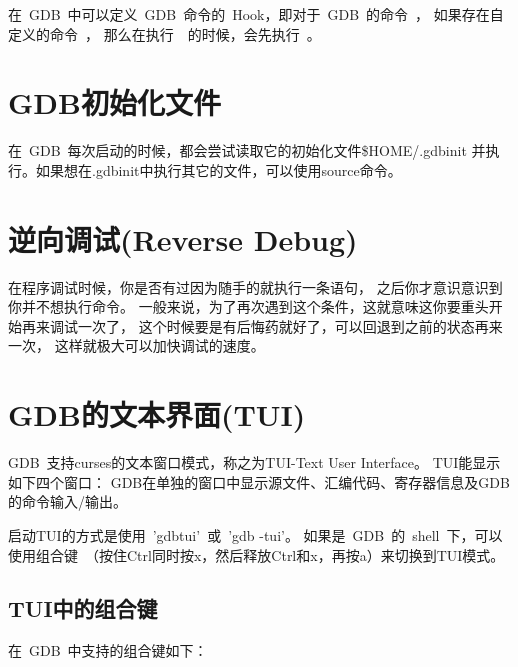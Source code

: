 在~GDB~中可以定义~GDB~命令的~Hook，即对于~GDB~的命令~，
如果存在自定义的命令~，
那么在执行~~的时候，会先执行~。


\section{GDB初始化文件}

在~GDB~每次启动的时候，都会尝试读取它的初始化文件\$HOME/.gdbinit
并执行。如果想在.gdbinit中执行其它的文件，可以使用source命令。

\noindent
{}



\section{逆向调试(Reverse Debug)}

在程序调试时候，你是否有过因为随手的就执行一条语句，
之后你才意识意识到你并不想执行命令。
一般来说，为了再次遇到这个条件，这就意味这你要重头开始再来调试一次了，
这个时候要是有后悔药就好了，可以回退到之前的状态再来一次，
这样就极大可以加快调试的速度。

\section{GDB的文本界面(TUI)}
GDB~支持curses的文本窗口模式，称之为TUI-Text User Interface。
TUI能显示如下四个窗口：
GDB在单独的窗口中显示源文件、汇编代码、寄存器信息及GDB的命令输入/输出。

启动TUI的方式是使用~'gdbtui'~或~'gdb -tui'。
如果是~GDB~的~shell~下，可以使用组合键~（按住Ctrl同时按x，然后释放Ctrl和x，再按a）来切换到TUI模式。

\subsection{TUI中的组合键}

在~GDB~中支持的组合键如下：

\noindent
{}



\noindent
{}


